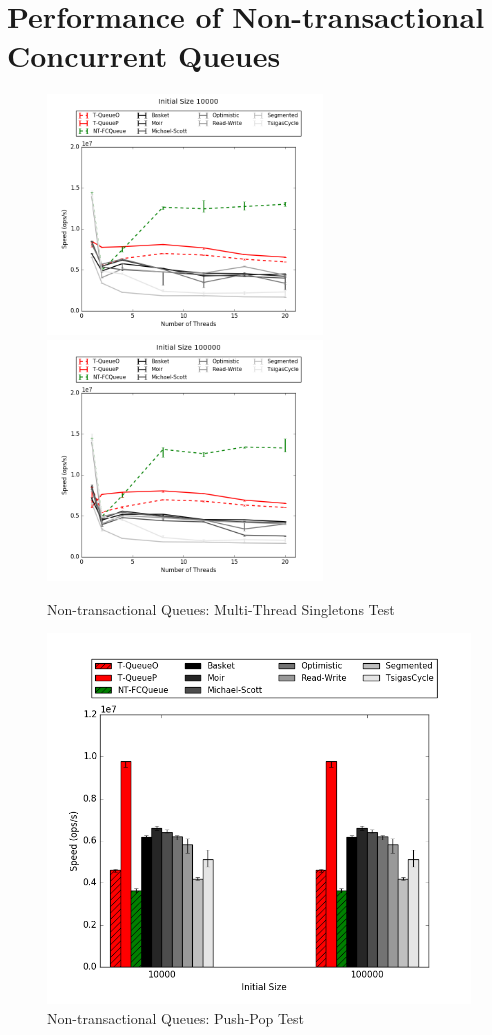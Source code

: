 \section{Performance of Non-transactional Concurrent Queues}
\begin{figure}[H]
    \centering
    \includegraphics[width=0.65\textwidth]{concurrent/allQ:RandSingleOps10000.png}
    \includegraphics[width=0.65\textwidth]{concurrent/allQ:RandSingleOps100000.png}
    \caption{Non-transactional Queues: Multi-Thread Singletons Test}
\end{figure}
\begin{figure}[H]
    \centering
    \includegraphics[width=\textwidth]{concurrent/allQ:PushPop.png}
    \caption{Non-transactional Queues: Push-Pop Test}
\end{figure}

